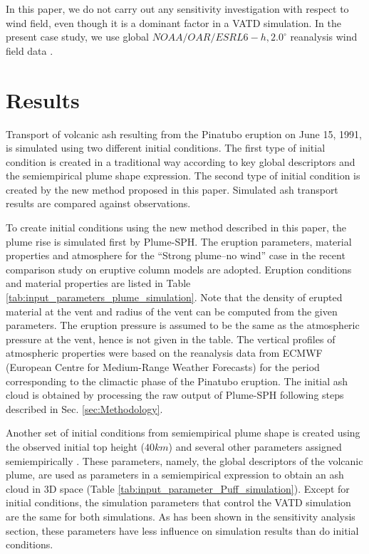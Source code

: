 \documentclass[utf8]{frontiersSCNS} %
\begin{document}
In this paper, we do not carry out any sensitivity investigation with respect to wind field, even though it is a dominant factor in a VATD simulation. In the present case study, we use global $NOAA/OAR/ESRL 6-h, 2.0^{\circ}$ reanalysis wind field data \citep{whitaker2004reanalysis, compo2006feasibility, compo2011twentieth}.

\section{Results}

Transport of volcanic ash resulting from the Pinatubo eruption on June 15, 1991, is simulated using two different initial conditions.
The first type of initial condition is created in a traditional way according to key global descriptors and the semiempirical plume shape expression. The second type of initial condition is created by the new method proposed in this paper. Simulated ash transport results are compared against observations.

To create initial conditions using the new method described in this paper, the plume rise is simulated first by Plume-SPH. The eruption parameters, material properties and atmosphere for the ``Strong plume--no wind'' case in the recent comparison study on eruptive column models \citep {costa2016results} are adopted. Eruption conditions and material properties are listed in Table \ref{tab:input_parameters_plume_simulation}. Note that the density of erupted material at the vent and radius of the vent can be computed from the given parameters. The eruption pressure is assumed to be the same as the atmospheric pressure at the vent, hence is not given in the table. The vertical profiles of atmospheric properties were  based on the reanalysis data from ECMWF (European Centre for Medium-Range Weather Forecasts) for the period corresponding to the climactic phase of the Pinatubo eruption. The initial ash cloud is obtained by processing the raw output of Plume-SPH following steps described in Sec. \ref{sec:Methodology}.

Another set of initial conditions from  semiempirical plume shape is created using the observed initial top height ($40 km$) and several other parameters assigned semiempirically \citep{bursik2012estimation}. These parameters, namely, the global descriptors of the volcanic plume, are used as parameters in a semiempirical expression to obtain an ash cloud in 3D space (Table \ref{tab:input_parameter_Puff_simulation}). Except for initial conditions, the simulation parameters that control the VATD simulation are the same for both simulations. As has been shown in the sensitivity analysis section, these parameters have less influence on simulation results than do initial conditions.
\end{document}
